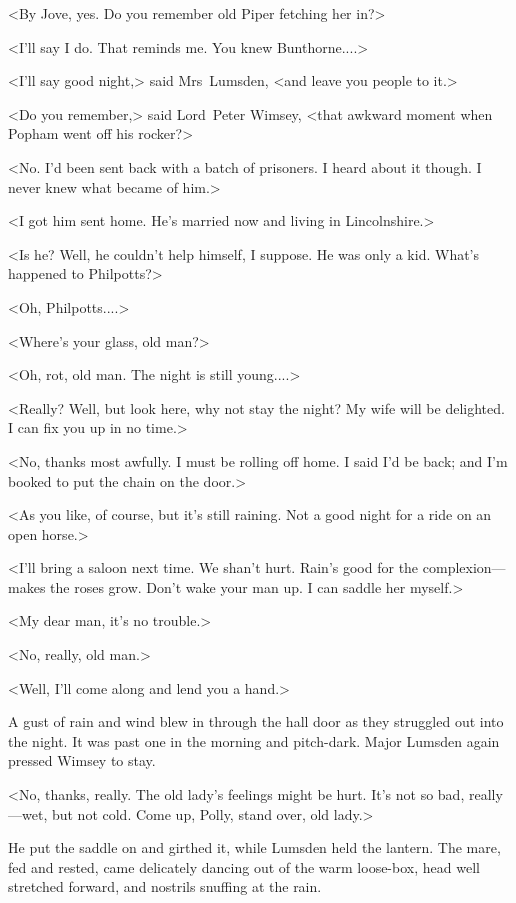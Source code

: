 <By Jove, yes. Do you remember old Piper fetching her in?>

<I'll say I do. That reminds me. You knew Bunthorne....>

<I'll say good night,> said Mrs~Lumsden, <and leave you people to it.>

<Do you remember,> said Lord~Peter Wimsey, <that awkward moment when Popham went off his rocker?>

<No. I'd been sent back with a batch of prisoners. I heard about it though. I never knew what became of him.>

<I got him sent home. He's married now and living in Lincolnshire.>

<Is he? Well, he couldn't help himself, I suppose. He was only a kid. What's happened to Philpotts?>

<Oh, Philpotts....>

\divider
<Where's your glass, old man?>

\divider
<Oh, rot, old man. The night is still young....>

\divider
<Really? Well, but look here, why not stay the night? My wife will be delighted. I can fix you up in no time.>

<No, thanks most awfully. I must be rolling off home. I said I'd be back; and I'm booked to put the chain on the door.>

<As you like, of course, but it's still raining. Not a good night for a ride on an open horse.>

<I'll bring a saloon next time. We shan't hurt. Rain's good for the complexion—makes the roses grow. Don't wake your man up. I can saddle her myself.>

<My dear man, it's no trouble.>

<No, really, old man.>

<Well, I'll come along and lend you a hand.>

A gust of rain and wind blew in through the hall door as they struggled out into the night. It was past one in the morning and pitch-dark. Major Lumsden again pressed Wimsey to stay.

<No, thanks, really. The old lady's feelings might be hurt. It's not so bad, really—wet, but not cold. Come up, Polly, stand over, old lady.>

He put the saddle on and girthed it, while Lumsden held the lantern. The mare, fed and rested, came delicately dancing out of the warm loose-box, head well stretched forward, and nostrils snuffing at the rain.

